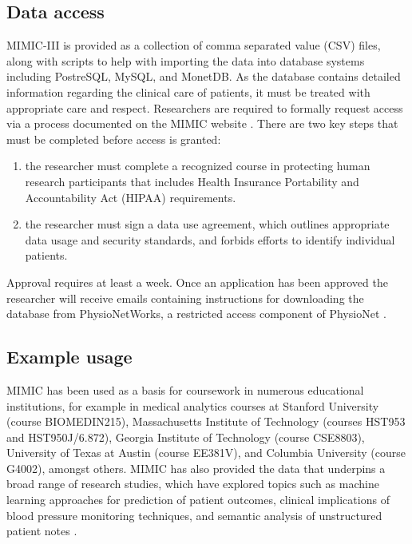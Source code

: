 \documentclass[english]{article}
\begin{document}

\subsection*{Data access}

MIMIC-III is provided as a collection of comma separated value (CSV) files, along with scripts to help with importing the data into database systems including PostreSQL, MySQL, and MonetDB. As the database contains detailed information regarding the clinical care of patients, it must be treated with appropriate care and respect. Researchers are required to formally request access via a process documented on the MIMIC website \cite{cite-mimic-website}. There are two key steps that must be completed before access is granted:

\begin{enumerate}
  \item the researcher must complete a recognized course in protecting human research participants that includes Health Insurance Portability and Accountability Act (HIPAA) requirements.
  \item the researcher must sign a data use agreement, which outlines appropriate data usage and security standards, and forbids efforts to identify individual patients.
\end{enumerate}

Approval requires at least a week. Once an application has been approved the researcher will receive emails containing instructions for downloading the database from PhysioNetWorks, a restricted access component of PhysioNet \cite{cite6}.

\subsection*{Example usage}

MIMIC has been used as a basis for coursework in numerous educational institutions, for example in medical analytics courses at Stanford University (course BIOMEDIN215), Massachusetts Institute of Technology (courses HST953 and HST950J/6.872), Georgia Institute of Technology (course CSE8803), University of Texas at Austin (course EE381V), and Columbia University (course G4002), amongst others. MIMIC has also provided the data that underpins a broad range of research studies, which have explored topics such as machine learning approaches for prediction of patient outcomes, clinical implications of blood pressure monitoring techniques, and semantic analysis of unstructured patient notes \cite{mimic-mayaud, mimic-lehman, mimic-velupillai, mimic-abhyankar}.
\end{document}
